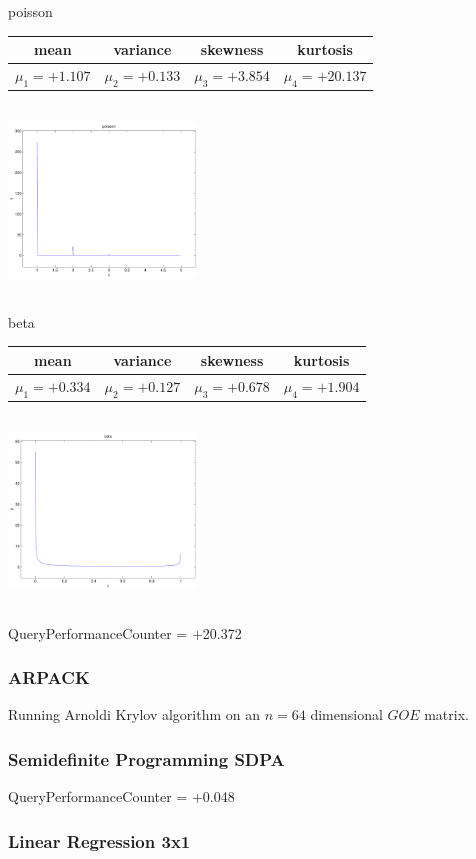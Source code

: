 \documentclass[12pt]{article}
\theoremstyle{definition}
\theoremstyle{remark}
\numberwithin{equation}{section}
\begin{document}
poisson \begin{tabular}{|c|c|c|c|}  mean & variance & skewness & kurtosis \\  \hline
$\mu_1 = +1.107$ & $\mu_2 = +0.133$ & $\mu_3 = +3.854$ & $\mu_4 =+20.137$ \\
\end{tabular}

\includegraphics[width=5cm,height=5cm]{poisson.pdf}

\newpage
beta \begin{tabular}{|c|c|c|c|}  mean & variance & skewness & kurtosis \\  \hline
$\mu_1 = +0.334$ & $\mu_2 = +0.127$ & $\mu_3 = +0.678$ & $\mu_4 =+1.904$ \\
\end{tabular}

\includegraphics[width=5cm,height=5cm]{beta.pdf}

QueryPerformanceCounter  =  +20.372
\subsubsection{ARPACK}
Running Arnoldi Krylov algorithm on an $n=64$ dimensional $GOE$ matrix.
\subsubsection{Semidefinite Programming SDPA}
QueryPerformanceCounter  =  +0.048
\subsubsection{Linear Regression 3x1}
\end{document}

